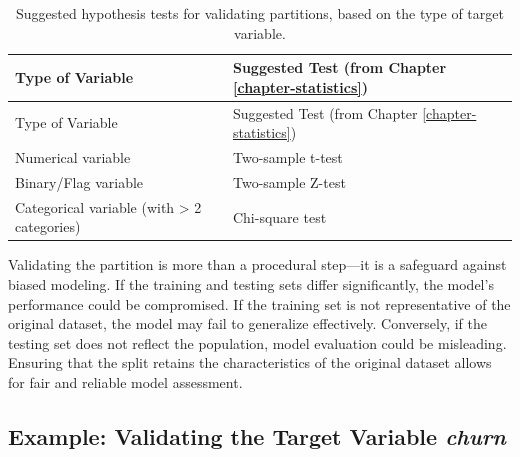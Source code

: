 \documentclass[
]{book}
\theoremstyle{definition}
\theoremstyle{definition}
\theoremstyle{definition}
\theoremstyle{definition}
\theoremstyle{remark}
\begin{document}
\begin{longtable}[]{@{}
  >{\raggedright\arraybackslash}p{}
  >{\raggedright\arraybackslash}p{}@{}}
\caption{\label{tab:partition-test} Suggested hypothesis tests for validating partitions, based on the type of target variable.}\tabularnewline
\toprule\noalign{}
\begin{minipage}[b]{\linewidth}\raggedright
Type of Variable
\end{minipage} & \begin{minipage}[b]{\linewidth}\raggedright
Suggested Test (from Chapter \ref{chapter-statistics})
\end{minipage} \\
\midrule\noalign{}
\endfirsthead
\toprule\noalign{}
\begin{minipage}[b]{\linewidth}\raggedright
Type of Variable
\end{minipage} & \begin{minipage}[b]{\linewidth}\raggedright
Suggested Test (from Chapter \ref{chapter-statistics})
\end{minipage} \\
\midrule\noalign{}
\endhead
\bottomrule\noalign{}
\endlastfoot
Numerical variable & Two-sample t-test \\
Binary/Flag variable & Two-sample Z-test \\
Categorical variable (with \textgreater{} 2 categories) & Chi-square test \\
\end{longtable}

Validating the partition is more than a procedural step---it is a safeguard against biased modeling. If the training and testing sets differ significantly, the model's performance could be compromised. If the training set is not representative of the original dataset, the model may fail to generalize effectively. Conversely, if the testing set does not reflect the population, model evaluation could be misleading. Ensuring that the split retains the characteristics of the original dataset allows for fair and reliable model assessment.

\subsection*{\texorpdfstring{Example: Validating the Target Variable \emph{churn}}{Example: Validating the Target Variable churn}}\label{example-validating-the-target-variable-churn}
\end{document}
